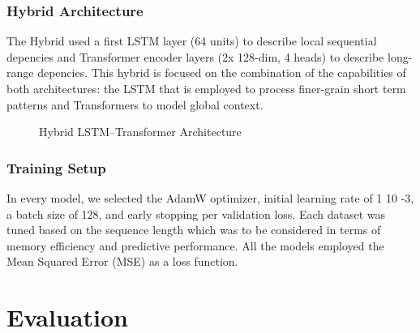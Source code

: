 \documentclass[conference]{IEEEtran}
\begin{document}
\subsubsection{Hybrid Architecture}
The Hybrid \cite{wu2020deep} used a first LSTM \cite{hochreiter1997lstm} layer (64 units) to describe local sequential depencies and Transformer \cite{vaswani2017attention} encoder layers (2x 128-dim, 4 heads) to describe long-range depencies. This hybrid is focused on the combination of the capabilities of both architectures: the LSTM \cite{hochreiter1997lstm} that is employed to process finer-grain short term patterns and Transformers to model global context.
\begin{figure}[htbp]
\centering
{}
\caption{Hybrid LSTM–Transformer Architecture}
\label{fig:hybrid_architecture}
\end{figure}

\subsubsection{Training Setup}
In every model, we selected the AdamW optimizer, initial learning rate of 1 10 -3, a batch size of 128, and early stopping per validation loss. Each dataset was tuned based on the sequence length which was to be considered in terms of memory efficiency and predictive performance. All the models employed the Mean Squared Error (MSE) as a loss function.
\section{Evaluation}
\end{document}

